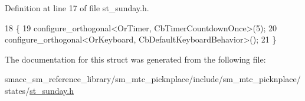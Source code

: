 Definition at line 17 of file st\+\_\+sunday.\+h.


\begin{DoxyCode}
18     \{
19         configure\_orthogonal<OrTimer,  CbTimerCountdownOnce>(5);   
20         configure\_orthogonal<OrKeyboard, CbDefaultKeyboardBehavior>();
21     \}
\end{DoxyCode}


The documentation for this struct was generated from the following file\+:\begin{DoxyCompactItemize}
\item 
smacc\+\_\+sm\+\_\+reference\+\_\+library/sm\+\_\+mtc\+\_\+picknplace/include/sm\+\_\+mtc\+\_\+picknplace/states/\hyperlink{sm__mtc__picknplace_2include_2sm__mtc__picknplace_2states_2st__sunday_8h}{st\+\_\+sunday.\+h}\end{DoxyCompactItemize}
